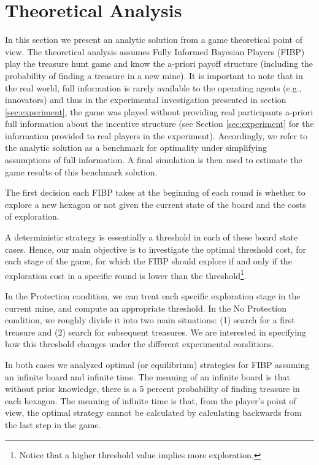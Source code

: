 
\section{Theoretical Analysis}\label{sec:theory}
In this section we present an analytic solution from a game theoretical point of view. The theoretical analysis assumes Fully Informed Bayesian Players (FIBP) play the treasure hunt game and know the a-priori payoff structure (including the probability of finding a treasure in a new mine). It is important to note that in the real world, full information is rarely available to the operating agents (e.g., innovators) and thus in the experimental investigation presented in section \ref{sec:experiment}, the game was played without providing real participants a-priori full information about the incentive structure (see Section \ref{sec:experiment} for the information provided to real players in the experiment). Accordingly, we refer to the analytic solution as a benchmark for optimality under simplifying assumptions of full information. A final simulation is then used to estimate the game results of this benchmark solution.

The first decision each FIBP takes at the beginning of each round is whether to explore a new hexagon or not given the current state of the board and the costs of exploration.

A deterministic strategy is essentially a threshold in each of these board state cases. Hence, our main objective is to investigate the optimal threshold cost, for each stage of the game, for which the FIBP should explore if and only if the exploration cost in a specific round is lower than the threshold\footnote{Notice that a higher threshold value implies more exploration.}.


In the Protection condition, we can treat each specific exploration stage in the current mine, and compute an appropriate threshold. In the No Protection condition, we roughly divide it into two main situations: (1) search for a first treasure and (2) search for subsequent treasures. We are interested in specifying how this threshold changes under the different experimental conditions. 

In both cases we analyzed optimal (or equilibrium) strategies for FIBP assuming an infinite board and infinite time. The meaning of an infinite board is that without prior knowledge, there is a 5 percent probability of finding treasure in each hexagon. The meaning of infinite time is that, from the player's point of view, the optimal strategy cannot be calculated by calculating backwards from the last step in the game.


